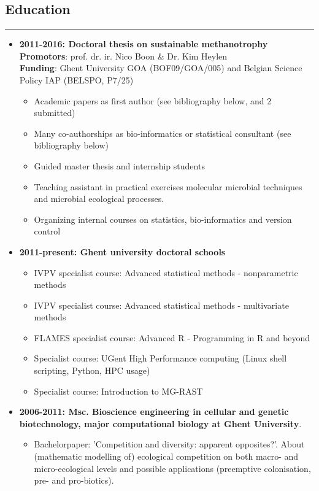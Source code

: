 \documentclass[a4paper,11pt,oneside]{article}
\begin{document}
\subsection*{Education}
\rule{\textwidth}{1pt}
\begin{itemize}
\item \textbf{2011-2016: Doctoral thesis on sustainable methanotrophy}\\
\textbf{Promotors}: prof. dr. ir. Nico Boon \& Dr. Kim Heylen \\
\textbf{Funding}: Ghent University GOA (BOF09/GOA/005) and Belgian Science Policy IAP (BELSPO, P7/25)
    \begin{itemize}
      \item Academic papers as first author (see bibliography below, \cite{kerckhof2014optimized} and 2 submitted)
      \item Many co-authorships as bio-informatics or statistical consultant  (see bibliography below)
      \item Guided master thesis and internship students
      \item Teaching assistant in practical exercises molecular microbial techniques and microbial ecological processes.
      \item Organizing internal courses on statistics, bio-informatics and version control
    \end{itemize}
\item \textbf{2011-present: Ghent university doctoral schools}
    \begin{itemize}
      \item IVPV specialist course: Advanced statistical methods - nonparametric methods
      \item IVPV specialist course: Advanced statistical methods - multivariate methods
      \item FLAMES specialist course: Advanced R - Programming in R and beyond
      \item Specialist course: UGent High Performance computing (Linux shell scripting, Python, HPC usage)
      \item Specialist course: Introduction to MG-RAST
    \end{itemize}
\item \textbf{2006-2011: Msc. Bioscience engineering in cellular and genetic biotechnology, major computational biology at Ghent University}. 
	\begin{itemize}
		\item Bachelorpaper: 'Competition and diversity: apparent opposites?'. About (mathematic modelling of) ecological competition on both macro- and micro-ecological levels and possible applications (preemptive colonisation, pre- and pro-biotics).

\end{itemize}
\end{itemize}
\end{document}
